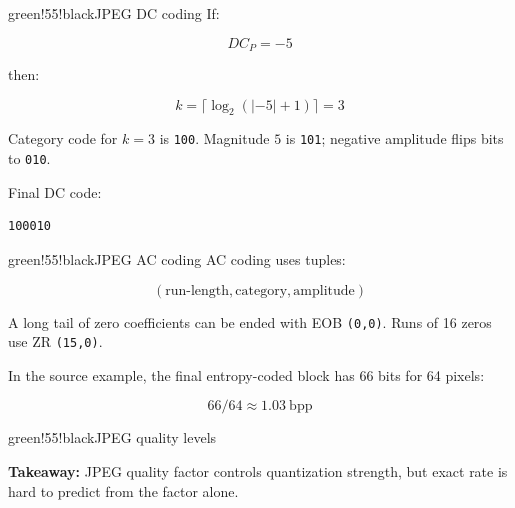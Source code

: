 \begin{calloutbox}{green!55!black}{JPEG DC coding}
If:

\[
DC_P=-5
\]

then:

\[
k=\lceil\log_2(|-5|+1)\rceil=3
\]

Category code for $k=3$ is \texttt{100}. Magnitude $5$ is \texttt{101}; negative amplitude flips bits to \texttt{010}.

Final DC code:

\begin{verbatim}
100010
\end{verbatim}
\end{calloutbox}

\begin{calloutbox}{green!55!black}{JPEG AC coding}
AC coding uses tuples:

\[
(\text{run-length},\text{category},\text{amplitude})
\]

A long tail of zero coefficients can be ended with EOB \texttt{(0,0)}. Runs of 16 zeros use ZR \texttt{(15,0)}.

In the source example, the final entropy-coded block has 66 bits for 64 pixels:

\[
66/64\approx1.03\ \text{bpp}
\]
\end{calloutbox}

\begin{calloutbox}{green!55!black}{JPEG quality levels}
\begin{center}
\end{center}

\textbf{Takeaway:} JPEG quality factor controls quantization strength, but exact rate is hard to predict from the factor alone.
\end{calloutbox}
